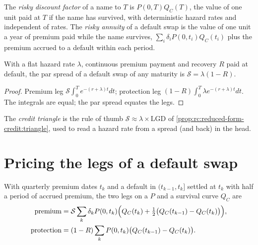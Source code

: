 \begin{definition}\label{def:rc:reduced-form-credit:risky}
The \emph{risky discount factor} of a name to $T$ is
$P(0,T)Q_C(T)$, the value of one unit paid at $T$ if the name has survived, with
deterministic hazard rates and independent of rates. The \emph{risky
annuity} of a default swap is the value of one unit a year of
premium paid while the name survives, $\sum_i\delta_iP(0,t_i)Q_C(t_i)$ plus the premium
accrued to a default within each period.
\end{definition}

\begin{proposition}\label{prop:rc:reduced-form-credit:triangle}
With a flat hazard rate $\lambda$, continuous premium payment and recovery $R$ paid at
default, the par spread of a default swap of any maturity is
$\mathcal S = \lambda(1-R)$.
\end{proposition}
\begin{proof}
Premium leg $\mathcal S\int_0^Te^{-(r+\lambda)t}dt$; protection leg
$(1-R)\int_0^T\lambda e^{-(r+\lambda)t}dt$. The integrals are equal; the par spread equates
the legs.
\end{proof}

\begin{definition}\label{def:rc:reduced-form-credit:triangledef}
The \emph{credit triangle} is the rule of thumb $\mathcal S \approx
\lambda\times\mathrm{LGD}$ of \cref{prop:rc:reduced-form-credit:triangle}, used to read a
hazard rate from a spread (and back) in the head.
\end{definition}

\section{Pricing the legs of a default swap}

With quarterly premium dates $t_k$ and a default in $(t_{k-1},t_k]$ settled at $t_k$ with
half a period of accrued premium, the two legs on a  $P$ and a survival
curve $Q_C$ are
\begin{align*}
\text{premium} &= \mathcal S\sum_k\delta_kP(0,t_k)\Bigl(Q_C(t_k)+\tfrac12\bigl(Q_C(t_{k-1})-Q_C(t_k)\bigr)\Bigr),\\
\text{protection} &= (1-R)\sum_kP(0,t_k)\bigl(Q_C(t_{k-1})-Q_C(t_k)\bigr).
\end{align*}

